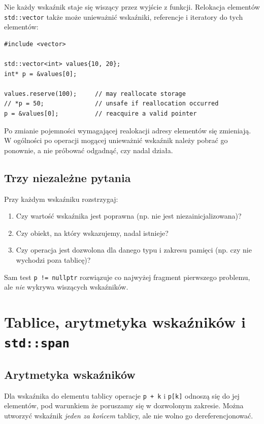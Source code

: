 Nie każdy wskaźnik staje się wiszący przez wyjście z funkcji.
Relokacja elementów \texttt{std::vector} także może unieważnić
wskaźniki, referencje i iteratory do tych elementów:

\begin{lstlisting}
#include <vector>

std::vector<int> values{10, 20};
int* p = &values[0];

values.reserve(100);     // may reallocate storage
// *p = 50;              // unsafe if reallocation occurred
p = &values[0];          // reacquire a valid pointer
\end{lstlisting}

Po zmianie pojemności wymagającej realokacji adresy elementów
się zmieniają. W ogólności po operacji mogącej unieważnić wskaźnik
należy pobrać go ponownie, a nie próbować odgadnąć, czy nadal działa.

\subsection{Trzy niezależne pytania}

Przy każdym wskaźniku rozstrzygaj:
\begin{enumerate}
    \item Czy wartość wskaźnika jest poprawna (np. nie jest
    niezainicjalizowana)?
    \item Czy obiekt, na który wskazujemy, nadal istnieje?
    \item Czy operacja jest dozwolona dla danego typu i zakresu pamięci
    (np. czy nie wychodzi poza tablicę)?
\end{enumerate}

Sam test \texttt{p != nullptr} rozwiązuje co najwyżej fragment
pierwszego problemu, ale \emph{nie} wykrywa wiszących wskaźników.

\section{Tablice, arytmetyka wskaźników i \texttt{std::span}}

\subsection{Arytmetyka wskaźników}

Dla wskaźnika do elementu tablicy operacje \texttt{p + k} i
\texttt{p[k]} odnoszą się do jej elementów, pod warunkiem że
poruszamy się w dozwolonym zakresie. Można utworzyć wskaźnik
\emph{jeden za końcem} tablicy, ale nie wolno go dereferencjonować.

